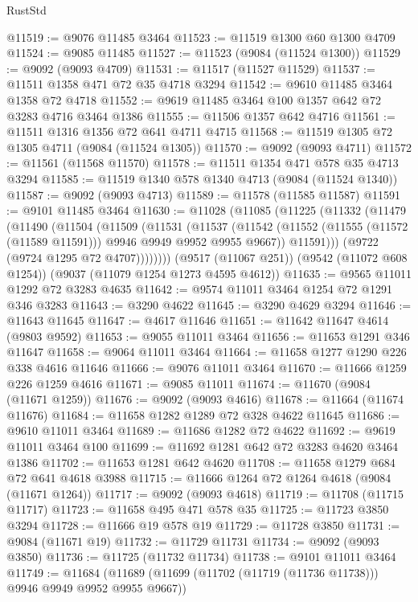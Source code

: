 \begin{lexlean}{RustStd}
\begin{coremodule}
@11519 := @9076 @11485 @3464
@11523 := @11519 @1300 @60 @1300 @4709
@11524 := @9085 @11485
@11527 := @11523 (@9084 (@11524 @1300))
@11529 := @9092 (@9093 @4709)
@11531 := @11517 (@11527 @11529)
@11537 := @11511 @1358 @471 @72 @35 @4718 @3294
@11542 := @9610 @11485 @3464 @1358 @72 @4718
@11552 := @9619 @11485 @3464 @100 @1357 @642 @72 @3283 @4716 @3464 @1386
@11555 := @11506 @1357 @642 @4716
@11561 := @11511 @1316 @1356 @72 @641 @4711 @4715
@11568 := @11519 @1305 @72 @1305 @4711 (@9084 (@11524 @1305))
@11570 := @9092 (@9093 @4711)
@11572 := @11561 (@11568 @11570)
@11578 := @11511 @1354 @471 @578 @35 @4713 @3294
@11585 := @11519 @1340 @578 @1340 @4713 (@9084 (@11524 @1340))
@11587 := @9092 (@9093 @4713)
@11589 := @11578 (@11585 @11587)
@11591 := @9101 @11485 @3464
@11630 := @11028
    (@11085
      (@11225
        (@11332
          (@11479
            (@11490
              (@11504
                (@11509
                  (@11531
                    (@11537
                      (@11542
                        (@11552 (@11555 (@11572 (@11589 @11591))) @9946 @9949 @9952 @9955 @9667))
                      @11591)))
                (@9722 (@9724 @1295 @72 @4707))))))))
    (@9517 (@11067 @251))
    (@9542 (@11072 @608 @1254))
    (@9037 (@11079 @1254 @1273 @4595 @4612))
@11635 := @9565 @11011 @1292 @72 @3283 @4635
@11642 := @9574 @11011 @3464 @1254 @72 @1291 @346 @3283
@11643 := @3290 @4622
@11645 := @3290 @4629 @3294
@11646 := @11643 @11645
@11647 := @4617 @11646
@11651 := @11642 @11647 @4614 (@9803 @9592)
@11653 := @9055 @11011 @3464
@11656 := @11653 @1291 @346 @11647
@11658 := @9064 @11011 @3464
@11664 := @11658 @1277 @1290 @226 @338 @4616 @11646
@11666 := @9076 @11011 @3464
@11670 := @11666 @1259 @226 @1259 @4616
@11671 := @9085 @11011
@11674 := @11670 (@9084 (@11671 @1259))
@11676 := @9092 (@9093 @4616)
@11678 := @11664 (@11674 @11676)
@11684 := @11658 @1282 @1289 @72 @328 @4622 @11645
@11686 := @9610 @11011 @3464
@11689 := @11686 @1282 @72 @4622
@11692 := @9619 @11011 @3464 @100
@11699 := @11692 @1281 @642 @72 @3283 @4620 @3464 @1386
@11702 := @11653 @1281 @642 @4620
@11708 := @11658 @1279 @684 @72 @641 @4618 @3988
@11715 := @11666 @1264 @72 @1264 @4618 (@9084 (@11671 @1264))
@11717 := @9092 (@9093 @4618)
@11719 := @11708 (@11715 @11717)
@11723 := @11658 @495 @471 @578 @35
@11725 := @11723 @3850 @3294
@11728 := @11666 @19 @578 @19
@11729 := @11728 @3850
@11731 := @9084 (@11671 @19)
@11732 := @11729 @11731
@11734 := @9092 (@9093 @3850)
@11736 := @11725 (@11732 @11734)
@11738 := @9101 @11011 @3464
@11749 := @11684 (@11689 (@11699 (@11702 (@11719 (@11736 @11738))) @9946 @9949 @9952 @9955 @9667))

\end{coremodule}
\end{lexlean}
